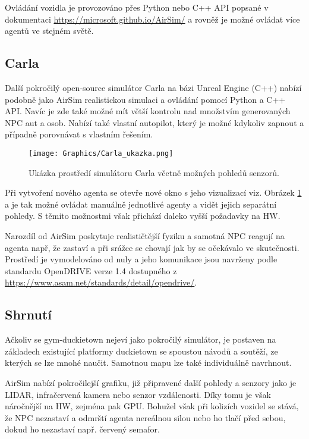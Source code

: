 \documentclass[czech, bc, kky, he, iso690alph]{fasthesis}
\begin{document}
    			Ovládání vozidla je provozováno přes Python nebo C++ API popsané v dokumentaci \href{https://microsoft.github.io/AirSim/}{https://microsoft.github.io/AirSim/} a rovněž je možné ovládat více agentů ve stejném světě.
	    		
	    	\subsection{Carla}
	    		Další pokročilý open-source simulátor Carla na bázi Unreal Engine (C++) nabízí podobně jako AirSim realistickou simulaci a ovládání pomocí Python a C++ API. Navíc je zde také možné mít větší kontrolu nad množstvím generovaných NPC aut a osob. Nabízí také vlastní autopilot, který je možné kdykoliv zapnout a případně porovnávat s vlastním řešením.
	    		
		    		\begin{figure}[h]
		    			\centering
		    			\texttt{[image: Graphics/Carla\_ukazka.png]}
		    			\caption{Ukázka prostředí simulátoru Carla včetně možných pohledů senzorů.}
		    			\label{pic:Carla_ukazka}
		    		\end{figure}
	    		
	    		Při vytvoření nového agenta se otevře nové okno s jeho vizualizací viz. Obrázek \ref{pic:Carla_ukazka} a je tak možné ovládat manuálně jednotlivé agenty a vidět jejich separátní pohledy. S těmito možnostmi však přichází daleko vyšší požadavky na HW.
	    		
	    		Narozdíl od AirSim poskytuje realističtější fyziku a samotná NPC reagují na agenta např, že zastaví a při srážce se chovají jak by se očekávalo ve skutečnosti. Prostředí je vymodelováno od nuly a jeho komunikace jsou navrženy podle standardu OpenDRIVE\textsuperscript{\textregistered} verze 1.4 dostupného z \href{https://www.asam.net/standards/detail/opendrive/}{https://www.asam.net/standards/detail/opendrive/}.
	    		
	    	\subsection{Shrnutí}
	    		Ačkoliv se gym-duckietown nejeví jako pokročilý simulátor, je postaven na základech existující platformy duckietown se spoustou návodů a soutěží, ze kterých se lze mnohé naučit. Samotnou mapu lze také individuálně navrhnout.
	    		
	    		AirSim nabízí pokročilejší grafiku, již připravené další pohledy a senzory jako je LIDAR, infračervená kamera nebo senzor vzdálenosti. Díky tomu je však náročnější na HW, zejména pak GPU. Bohužel však při kolizích vozidel se stává, že NPC nezastaví a odmrští agenta nereálnou silou nebo ho tlačí před sebou, dokud ho nezastaví např. červený semafor.
	    		
\end{document}

